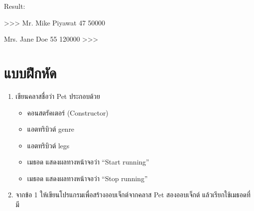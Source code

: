Result:
\begin{codelist}{}{}
>>>
Mr. Mike Piyawat
47
50000


Mrs. Jane Doe
55
120000
>>> 
\end{codelist}


\section{แบบฝึกหัด}
\begin{enumerate} 
\item 	เขียนคลาสชื่อว่า Pet ประกอบด้วย
	\begin{itemize}
	\item 	คอนสตรัคเตอร์ (Constructor)
	\item 	แอตทริบิวต์ genre
	\item 	แอตทริบิวต์ legs
	\item 	เมธอด  แสดงผลทางหน้าจอว่า “Start running”
	\item 	เมธอด  แสดงผลทางหน้าจอว่า “Stop running”
	\end{itemize}
\item 	 จากข้อ 1 ให้เขียนโปรแกรมเพื่อสร้างออบเจ็กต์จากคลาส Pet สองออบเจ็กต์ แล้วเรียกใช้เมธอดที่มี
\end{enumerate}